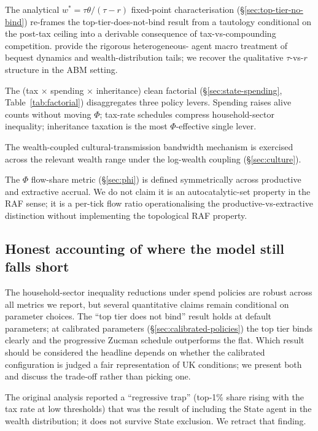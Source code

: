 \documentclass[11pt]{article}
\begin{document}
The analytical $w^* = \tau \theta / (\tau - r)$ fixed-point
characterisation (\S\ref{sec:top-tier-no-bind}) re-frames the
top-tier-does-not-bind result from a tautology conditional on the
post-tax ceiling
into a derivable consequence of tax-vs-compounding competition.
\citet{benhabib2011distribution} provide the rigorous heterogeneous-
agent macro treatment of bequest dynamics and wealth-distribution
tails; we recover the qualitative $\tau$-vs-$r$ structure in the
ABM setting.

The (tax $\times$ spending $\times$ inheritance) clean factorial
(\S\ref{sec:state-spending}, Table~\ref{tab:factorial}) disaggregates
three policy levers. Spending raises alive counts without
moving $\Phi$; tax-rate schedules compress household-sector
inequality; inheritance taxation is the most $\Phi$-effective
single lever.

The wealth-coupled cultural-transmission bandwidth mechanism
\citep{henrich2001evolution, henrich2004demography,
spangler2022distribution} is exercised across the relevant wealth
range under the log-wealth coupling (\S\ref{sec:culture}).

The $\Phi$ flow-share metric (\S\ref{sec:phi}) is defined
symmetrically across productive and extractive accrual. We do not
claim it is an autocatalytic-set property in the
\citet{hordijk2004detecting} RAF sense; it is a per-tick flow ratio
operationalising the productive-vs-extractive distinction without
implementing the topological RAF property.

\subsection{Honest accounting of where the model still falls short}

The household-sector inequality reductions under spend policies are
robust across all metrics we report, but several quantitative claims
remain conditional on parameter choices. The ``top tier does not
bind'' result holds at default parameters; at calibrated parameters
(\S\ref{sec:calibrated-policies}) the top tier binds clearly and the
progressive Zucman schedule outperforms the flat. Which result
should be considered the headline depends on whether the calibrated
configuration is judged a fair representation of UK conditions; we
present both and discuss the trade-off rather than picking one.

The original analysis reported a ``regressive trap'' (top-1\% share
rising with the tax rate at low thresholds) that was the result of
including the State agent in the wealth distribution; it does not
survive State exclusion. We retract that finding.
\end{document}
